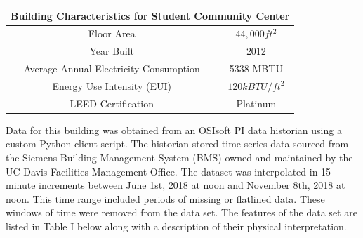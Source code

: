 \documentclass[letterpaper, 12 pt, conference]{ieeeconf}  %
\begin{document}
\begin{table}[H]
        \centering
        \begin{tabular}{cc}
        \toprule
        \multicolumn{2}{c}{Building Characteristics for Student Community Center}
        \\ \midrule
        Floor Area                             & $44,000ft^2$    \\
        Year Built                             & 2012            \\
        Average Annual Electricity Consumption & 5338 MBTU       \\
        Energy Use Intensity (EUI)             & $120 kBTU/ft^2$ \\ 
        LEED Certification                     & Platinum        \\
        \bottomrule
        \end{tabular}
\end{table}

Data for this building was obtained from an OSIsoft PI data historian using a custom Python client script. The historian stored time-series data sourced from the Siemens Building Management System (BMS) owned and maintained by the UC Davis Facilities Management Office. The dataset was interpolated in 15-minute increments between June 1st, 2018 at noon and November 8th, 2018 at noon. This time range included periods of missing or flatlined data. These windows of time were removed from the data set. The features of the data set are listed in Table I below along with a description of their physical interpretation.

\end{document}
